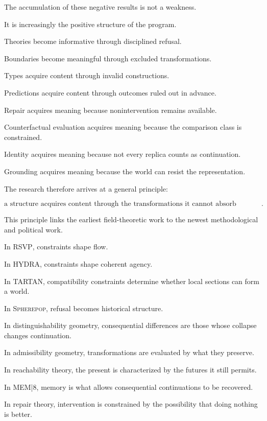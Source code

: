 \documentclass[11pt]{article}
\theoremstyle{remark}
\newcommand{\RSVP}{\textsc{RSVP}}
\newcommand{\HYDRA}{\textsc{HYDRA}}
\newcommand{\TARTAN}{\textsc{TARTAN}}
\newcommand{\MEM}{\textsc{MEM|8}}
\newcommand{\Spherepop}{\textsc{Spherepop}}
\begin{document}
The accumulation of these negative results is not a weakness.

It is increasingly the positive structure of the program.

Theories become informative through disciplined refusal.

Boundaries become meaningful through excluded transformations.

Types acquire content through invalid constructions.

Predictions acquire content through outcomes ruled out in advance.

Repair acquires meaning because nonintervention remains available.

Counterfactual evaluation acquires meaning because the comparison class is constrained.

Identity acquires meaning because not every replica counts as continuation.

Grounding acquires meaning because the world can resist the representation.

The research therefore arrives at a general principle:

\begin{equation}
\boxed{
\text{a structure acquires content through the transformations it cannot absorb without becoming something else}.
}
\end{equation}

This principle links the earliest field-theoretic work to the newest methodological and political work.

In \RSVP{}, constraints shape flow.

In \HYDRA{}, constraints shape coherent agency.

In \TARTAN{}, compatibility constraints determine whether local sections can form a world.

In \Spherepop{}, refusal becomes historical structure.

In distinguishability geometry, consequential differences are those whose collapse changes continuation.

In admissibility geometry, transformations are evaluated by what they preserve.

In reachability theory, the present is characterized by the futures it still permits.

In \MEM{}, memory is what allows consequential continuations to be recovered.

In repair theory, intervention is constrained by the possibility that doing nothing is better.
\end{document}
